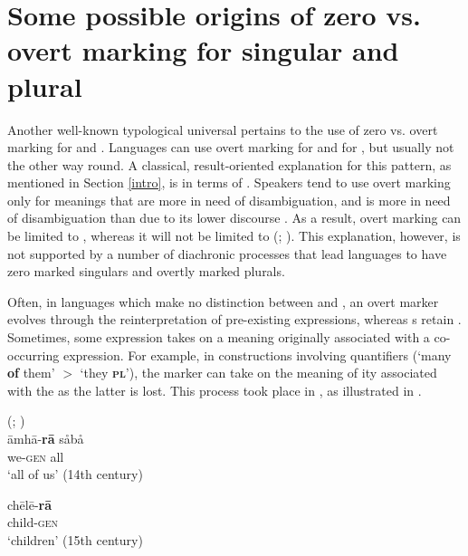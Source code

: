 \documentclass[output=paper]{langsci/langscibook}
\begin{document}
\section{Some possible origins of zero vs. overt marking for singular
  and plural}\label{number}
Another well-known typological
universal pertains to the use of zero vs. overt
marking for  and . Languages can use overt marking for  and  for
  , but usually not the other way round. A classical,
  result-oriented explanation for this pattern, as
  mentioned in Section \ref{intro},  is in terms of . Speakers tend to use overt marking
  only for meanings that are more in need of disambiguation, and  is more in need of disambiguation than  due to its
  lower discourse . As a result, overt marking can be limited
  to , whereas it will not be limited to  (\citealt{Greenberg1966,TU2};
  \citealt{Haspelmath2008}).  This explanation, however, is not
supported by a number of diachronic processes that lead languages to
have zero marked singulars and overtly marked plurals.


Often, in languages which make no distinction between 
and , an overt  marker evolves through the reinterpretation of
pre-existing expressions, whereas
    s retain . Sometimes, some expression takes on a  meaning originally associated with
      a co-occurring expression. For example, in 
      constructions involving  quantifiers (`many
      {\bf of} them' $>$ `they  {\bf \textsc{pl}}'), the  marker can take on the meaning of
      ity associated with the  as the latter is
      lost. This process took place in  , as illustrated in .

\newpage

\ea\label{bengali}
 (; )\\
\ea
\gll āmhā-\textbf{{rā}} s{\r{a}}b{\r{a}}\\
we-\textsc{gen} all\\
\glt `all of us' (14th century)


\ex
\gll chēlē-\textbf{{rā}} \\
child-\textsc{gen}\\
\glt `children' (15th century)
\end{document}
